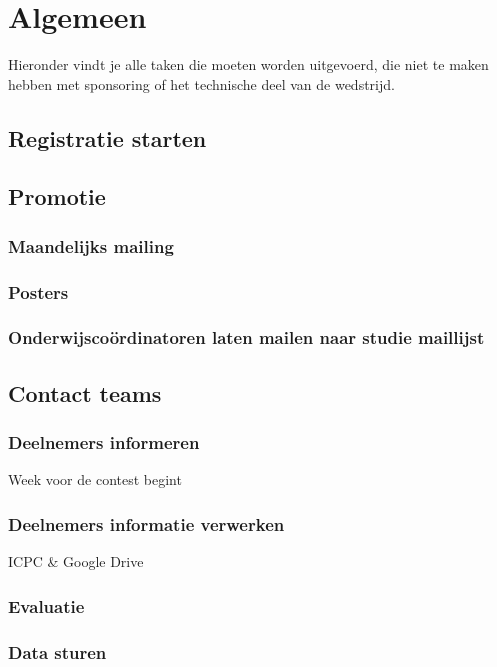 \section{Algemeen}
Hieronder vindt je alle taken die moeten worden uitgevoerd, die niet te maken hebben met sponsoring of het technische deel van de wedstrijd.		
	\subsection{Registratie starten}
	
	\subsection{Promotie}
		\subsubsection{Maandelijks mailing}
	
		\subsubsection{Posters}
	
		\subsubsection{Onderwijsco\"ordinatoren laten mailen naar studie maillijst}

	\subsection{Contact teams}
		\subsubsection{Deelnemers informeren}
		Week voor de contest begint
	
		\subsubsection{Deelnemers informatie verwerken}
		ICPC \& Google Drive
	
		\subsubsection{Evaluatie}
		
		\subsubsection{Data sturen}
		
